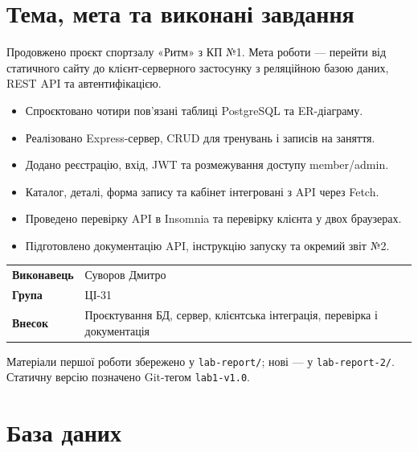 \documentclass[12pt,a4paper]{article}
\newcommand{\AuthorName}{Суворов Дмитро}
\newcommand{\StudentGroup}{ЦІ-31}
\newcommand{\file}[1]{\texttt{#1}}
\begin{document}
\section{Тема, мета та виконані завдання}
Продовжено проєкт спортзалу «Ритм» з КП №1. Мета роботи --- перейти від статичного сайту до клієнт-серверного застосунку з реляційною базою даних, REST API та автентифікацією.
\begin{itemize}
\item Спроєктовано чотири пов'язані таблиці PostgreSQL та ER-діаграму.
\item Реалізовано Express-сервер, CRUD для тренувань і записів на заняття.
\item Додано реєстрацію, вхід, JWT та розмежування доступу member/admin.
\item Каталог, деталі, форма запису та кабінет інтегровані з API через Fetch.
\item Проведено перевірку API в Insomnia та перевірку клієнта у двох браузерах.
\item Підготовлено документацію API, інструкцію запуску та окремий звіт №2.
\end{itemize}
\noindent\begin{tabularx}{\textwidth}{>{\RaggedRight\arraybackslash\bfseries}p{40mm}X}
Виконавець & \AuthorName\\
Група & \StudentGroup\\
Внесок & Проєктування БД, сервер, клієнтська інтеграція, перевірка і документація\\
\end{tabularx}
Матеріали першої роботи збережено у \file{lab-report/}; нові --- у \file{lab-report-2/}. Статичну версію позначено Git-тегом \file{lab1-v1.0}.

\section{База даних}
\end{document}
